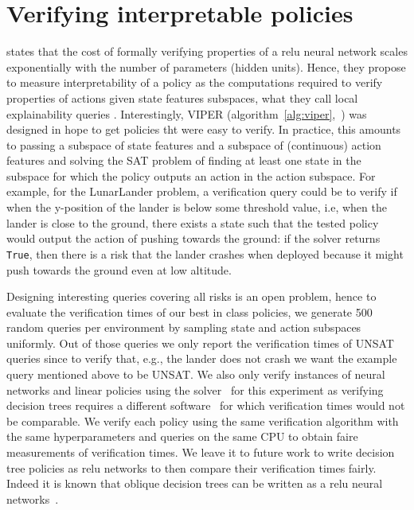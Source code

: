 \section{Verifying interpretable policies}\label{sec:verif}
\cite{lens-complexity} states that the cost of formally verifying properties of a relu neural network scales exponentially with the number of parameters (hidden units).
Hence, they propose to measure interpretability of a policy as the computations required to verify properties of actions given state features subspaces, what they call local explainability queries \cite{query}.
Interestingly, VIPER (algorithm~\ref{alg:viper},~\cite{viper}) was designed in hope to get policies tht were easy to verify.
In practice, this amounts to passing a subspace of state features and a subspace of (continuous) action features and solving the SAT problem of finding at least one state in the subspace for which the policy outputs an action in the action subspace.
For example, for the LunarLander problem, a verification query could be to verify if when the y-position of the lander is below some threshold value, i.e, when the lander is close to the ground, there exists a state such that the tested policy would output the action of pushing towards the ground: if the solver returns \texttt{True}, then there is a risk that the lander crashes when deployed because it might push towards the ground even at low altitude.

Designing interesting queries covering all risks is an open problem, hence to evaluate the verification times of our best in class policies, we generate 500 random queries per environment by sampling state and action subspaces uniformly.
Out of those queries we only report the verification times of UNSAT queries since to verify that, e.g., the lander does not crash we want the example query mentioned above to be UNSAT.
We also only verify instances of neural networks and linear policies using the solver~\cite{maraboupy} for this experiment as verifying decision trees requires a different software~\cite{z3} for which verification times would not be comparable.
We verify each policy using the same verification algorithm with the same hyperparameters and queries on the same CPU to obtain faire measurements of verification times.
We leave it to future work to write decision tree policies as relu networks to then compare their verification times fairly.
Indeed it is known that oblique decision trees can be written as a relu neural networks~\cite{Lee2020Oblique}.


